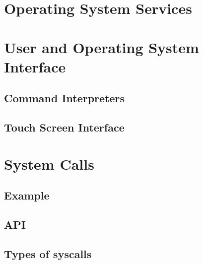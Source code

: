 \documentclass{book/custombook}
\begin{document}
        \section{Operating System Services}
        \section{User and Operating System Interface}
            \subsection{Command Interpreters}
            \subsection{Touch Screen Interface}
        \section{System Calls}
            \subsection{Example}
            \subsection{API}
            \subsection{Types of syscalls}
\end{document}
